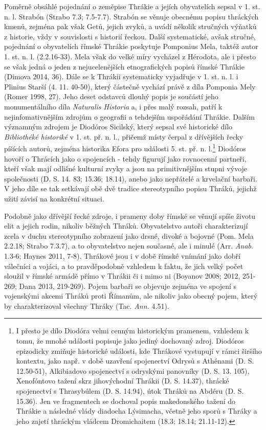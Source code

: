 Poměrně obsáhlé pojednání o zeměpise Thrákie a jejích obyvatelích sepsal v 1. st. n. l. Strabón (Strabo 7.3; 7.5-7.7). Strabón se věnuje obecnému popisu thráckých kmenů, zejména pak však Getů, jejich zvyků, a uvádí několik stručných výňatků z historie, vždy v souvislosti s historií řeckou. Další systematické, avšak stručné, pojednání o obyvatelích římské Thrákie poskytuje Pomponius Mela, taktéž autor 1. st. n. l. (2.2.16-33). Mela však do velké míry vycházel z Hérodota, ale i přesto se však jedná o jeden z nejucelenějších etnografických popisů římské Thrákie (Dimova 2014, 36). Dále se k Thrákii systematicky vyjadřuje v 1. st. n. l. i Plinius Starší (4. 11. 40-50), který částečně vychází právě z díla Pomponia Mely (Romer 1998, 27). Jeho deset odstavců dlouhý popis je součástí jeho monumentálního díla {\em Naturalis Historia} a, i přes malý rozsah, patří k nejinfomativnějším zdrojům o geografii a tehdejším uspořádání Thrákie. Dalším významným zdrojem je Diodóros Sicilský, který sepsal své historické dílo {\em Bibliothéké historiké} v 1. st. př. n. l., přičemž místy čerpal z dřívějších řecky píšících autorů, zejména historika Efora pro události 5. st. př. n. l.\footnote{I přesto je dílo Diodóra velmi cenným historickým pramenem, vzhledem k tomu, že mnohé události popisuje jako jediný dochovaný zdroj. Diodóros epizodicky zmiňuje historické události, kde Thrákové vystupují v rámci širšího kontextu, jako např. v době uzavření spojenectví Odrysů s Athénami (D. S. 12.50-51), Alkibiadovo spojenectví s odryskými panovníky (D. S. 13. 105), Xenofóntovo tažení skrz jihovýchodní Thrákii (D. S. 14.37), thrácké spojenectví s Thrasybúlem (D. S. 14.94), útok Thráků na Abdéru (D. S. 15.36). Jen ve fragmentech se dochoval popis makedonského tažení do Thrákie a následné vlády diadocha Lýsimacha, včetně jeho sporů s Thráky a jeho zajetí thráckým vládcem Dromichaitem (18.3; 18.14; 21.11-12).} Diodóros hovoří o Thrácích jako o spojencích - tehdy figurují jako rovnocenní partneři, kteří však mají odlišné kulturní zvyky a jsou na primitivnějším stupni vývoje společnosti (D. S. 14. 83; 15.36; 18.14), anebo jako nepřátelé a krvelační barbaři. V jeho díle se tak setkávají obě dvě tradice stereotypního popisu Thráků, jejichž užití závisí na konkrétní situaci.

Podobně jako dřívější řecké zdroje, i prameny doby římské se věnují spíše životu elit a jejich rodin, nikoliv běžných Thráků. Obyvatelstvo autoři charakterizují zcela v duchu stereotypního zobrazení jako drsné, divoké a bojovné (Pom. Mela 2.2.18; Strabo 7.3.7), a to obyvatelstvo nejen současné, ale i minulé (Arr. {\em Anab}. 1.3-6; Haynes 2011, 7-8). Thrákové jsou i v době římské vnímání jako dobří válečníci a vojáci, a to pravděpodobně vzhledem k faktu, že jich velký počet sloužil v římské armádě přímo v Thrákii či i mimo ni (Boyanov 2008; 2012, 251-269; Dana 2013, 219-269). Pojem barbaři se objevuje zejména ve spojení s vojenskými akcemi Thráků proti Římanům, ale nikoliv jako obecný pojem, který by charakterizoval všechny Thráky (Tac. {\em Ann.} 4.51).

